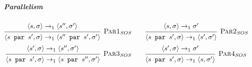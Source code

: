 \subparagraph{Parallelism}
\[
    \begin{prooftree}
        \hypo{\langle s, \sigma \rangle \rightarrow_1 \langle s'', \sigma' \rangle}
        \infer1[\textsc{Par1}$_{SOS}$]{\langle s \texttt{ par } s', \sigma \rangle \rightarrow_1 \langle s'' \texttt{ par } s', \sigma' \rangle}
    \end{prooftree}
    \qquad
    \begin{prooftree}
        \hypo{\langle s, \sigma \rangle \rightarrow_1 \sigma'}
        \infer1[\textsc{Par2}$_{SOS}$]{\langle s \texttt{ par } s', \sigma \rangle \rightarrow_1 \langle s', \sigma' \rangle}
    \end{prooftree}
\]
\[
    \begin{prooftree}
        \hypo{\langle s', \sigma \rangle \rightarrow_1 \langle s'', \sigma' \rangle}
        \infer1[\textsc{Par3}$_{SOS}$]{\langle s \texttt{ par } s', \sigma \rangle \rightarrow_1 \langle s \texttt{ par } s'', \sigma' \rangle}
    \end{prooftree}
    \qquad
    \begin{prooftree}
        \hypo{\langle s', \sigma \rangle \rightarrow_1 \sigma'}
        \infer1[\textsc{Par4}$_{SOS}$]{\langle s \texttt{ par } s', \sigma \rangle \rightarrow_1 \langle s, \sigma' \rangle}
    \end{prooftree}
\]

